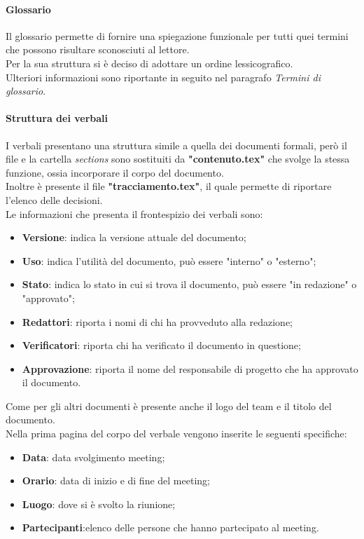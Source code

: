 \paragraph{Glossario}
Il glossario permette di fornire una spiegazione funzionale per tutti quei termini che possono risultare sconosciuti al lettore.\\
Per la sua struttura si è deciso di adottare un ordine lessicografico.\\
Ulteriori informazioni sono riportante in seguito nel paragrafo \textit{Termini di glossario}.

\paragraph{Struttura dei verbali}
I verbali presentano una struttura simile a quella dei documenti formali, però il file e la cartella \textit{sections} sono sostituiti da \textbf{"contenuto.tex"} che svolge la stessa funzione, ossia incorporare il corpo del documento.\\
Inoltre è presente il file \textbf{"tracciamento.tex"}, il quale permette di riportare l'elenco delle decisioni.\\
Le informazioni che presenta il frontespizio dei verbali sono:
\begin{itemize}
    \item\textbf{Versione}: indica la versione attuale del documento;
    \item\textbf{Uso}: indica l'utilità del documento, può essere "interno" o "esterno";
    \item\textbf{Stato}: indica lo stato in cui si trova il documento, può essere "in redazione" o "approvato";
    \item\textbf{Redattori}: riporta i nomi di chi ha provveduto alla redazione;
    \item\textbf{Verificatori}: riporta chi ha verificato il documento in questione;
    \item\textbf{Approvazione}: riporta il nome del responsabile di progetto che ha approvato il documento.
\end{itemize}
Come per gli altri documenti è presente anche il logo del team e il titolo del documento.\\
Nella prima pagina del corpo del verbale vengono inserite le seguenti specifiche:
\begin{itemize}
    \item\textbf{Data}: data svolgimento meeting;
    \item\textbf{Orario}: data di inizio e di fine del meeting;
    \item\textbf{Luogo}: dove si è svolto la riunione;
    \item\textbf{Partecipanti}:elenco delle persone che hanno partecipato al meeting.
\end{itemize}
